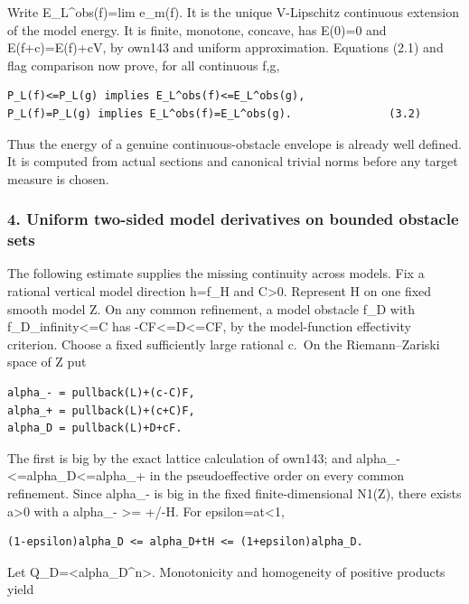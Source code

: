 \documentclass[
  10pt,
]{article}
\begin{document}
Write E\_L\^{}obs(f)=lim e\_m(f). It is the unique V-Lipschitz
continuous extension of the model energy. It is finite, monotone,
concave, has E(0)=0 and E(f+c)=E(f)+cV, by own143 and uniform
approximation. Equations (2.1) and flag comparison now prove, for all
continuous f,g,

\begin{verbatim}
P_L(f)<=P_L(g) implies E_L^obs(f)<=E_L^obs(g),
P_L(f)=P_L(g) implies E_L^obs(f)=E_L^obs(g).               (3.2)
\end{verbatim}

Thus the energy of a genuine continuous-obstacle envelope is already
well defined. It is computed from actual sections and canonical trivial
norms before any target measure is chosen.

\subsubsection{4. Uniform two-sided model derivatives on bounded
obstacle
sets}\label{uniform-two-sided-model-derivatives-on-bounded-obstacle-sets}

The following estimate supplies the missing continuity across models.
Fix a rational vertical model direction h=f\_H and C\textgreater0.
Represent H on one fixed smooth model Z. On any common refinement, a
model obstacle f\_D with
\textbar\textbar f\_D\textbar\textbar\_infinity\textless=C has
-CF\textless=D\textless=CF, by the model-function effectivity criterion.
Choose a fixed sufficiently large rational c.~On the Riemann--Zariski
space of Z put

\begin{verbatim}
alpha_- = pullback(L)+(c-C)F,
alpha_+ = pullback(L)+(c+C)F,
alpha_D = pullback(L)+D+cF.
\end{verbatim}

The first is big by the exact lattice calculation of own143; and
alpha\_-\textless=alpha\_D\textless=alpha\_+ in the pseudoeffective
order on every common refinement. Since alpha\_- is big in the fixed
finite-dimensional N1(Z), there exists a\textgreater0 with a alpha\_-
\textgreater= +/-H. For epsilon=a\textbar t\textbar\textless1,

\begin{verbatim}
(1-epsilon)alpha_D <= alpha_D+tH <= (1+epsilon)alpha_D.
\end{verbatim}

Let Q\_D=\textless alpha\_D\^{}n\textgreater. Monotonicity and
homogeneity of positive products yield
\end{document}
